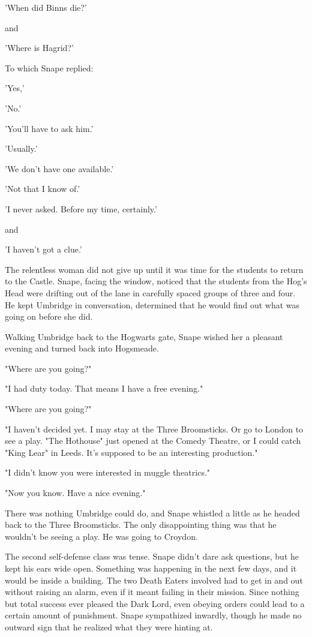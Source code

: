 \documentclass[a4paper,11pt]{article}
\begin{document}
'When did Binns die?'

and

'Where is Hagrid?'

To which Snape replied:

'Yes,'

'No.'

'You'll have to ask him.'

'Usually.'

'We don't have one available.'

'Not that I know of.'

'I never asked. Before my time, certainly.'

and

'I haven't got a clue.'

The relentless woman did not give up until it was time for the students to return to the Castle. Snape, facing the window, noticed that the students from the Hog's Head were drifting out of the lane in carefully spaced groups of three and four. He kept Umbridge in conversation, determined that he would find out what was going on before she did.

Walking Umbridge back to the Hogwarts gate, Snape wished her a pleasant evening and turned back into Hogsmeade.

"Where are you going?"

"I had duty today. That means I have a free evening."

"Where are you going?"

"I haven't decided yet. I may stay at the Three Broomsticks. Or go to London to see a play. "The Hothouse" just opened at the Comedy Theatre, or I could catch "King Lear" in Leeds. It's supposed to be an interesting production."

"I didn't know you were interested in muggle theatrics."

"Now you know. Have a nice evening."

There was nothing Umbridge could do, and Snape whistled a little as he headed back to the Three Broomsticks. The only disappointing thing was that he wouldn't be seeing a play. He was going to Croydon.

The second self-defense class was tense. Snape didn't dare ask questions, but he kept his ears wide open. Something was happening in the next few days, and it would be inside a building. The two Death Eaters involved had to get in and out without raising an alarm, even if it meant failing in their mission. Since nothing but total success ever pleased the Dark Lord, even obeying orders could lead to a certain amount of punishment. Snape sympathized inwardly, though he made no outward sign that he realized what they were hinting at.
\end{document}
